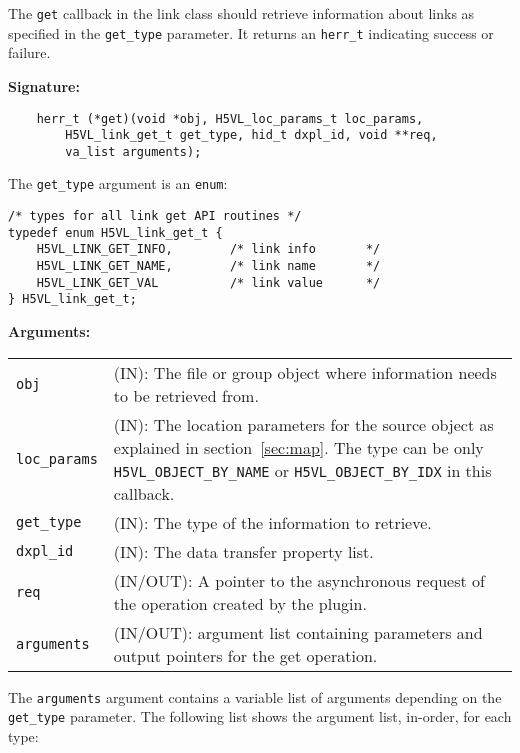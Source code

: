 The {\tt get} callback in the link class should retrieve information
about links as specified in the {\tt get\_type} parameter. It
returns an {\tt herr\_t} indicating success or failure.

\textbf{Signature:}
\begin{lstlisting}
    herr_t (*get)(void *obj, H5VL_loc_params_t loc_params, 
        H5VL_link_get_t get_type, hid_t dxpl_id, void **req, 
        va_list arguments);
\end{lstlisting}

The {\tt get\_type} argument is an {\tt enum}:
\begin{lstlisting}
/* types for all link get API routines */
typedef enum H5VL_link_get_t {
    H5VL_LINK_GET_INFO,        /* link info       */
    H5VL_LINK_GET_NAME,        /* link name       */
    H5VL_LINK_GET_VAL          /* link value      */
} H5VL_link_get_t;
\end{lstlisting}

\textbf{Arguments:}\\
\begin{tabular}{l p{10cm}}
  {\tt obj} & (IN): The file or group object where information needs to be
  retrieved from.\\
  {\tt loc\_params} & (IN): The location parameters for the source
  object as explained in section~\ref{sec:map}. The type can be only {\tt
    H5VL\_OBJECT\_BY\_NAME} or {\tt H5VL\_OBJECT\_BY\_IDX} in this
  callback.\\ 
  {\tt get\_type} & (IN): The type of the information to retrieve.\\
  {\tt dxpl\_id} & (IN): The data transfer property list.\\
  {\tt req} & (IN/OUT): A pointer to the asynchronous request of the
  operation created by the plugin.\\
  {\tt arguments} & (IN/OUT): argument list containing parameters and
  output pointers for the get operation. \\
\end{tabular}

The {\tt arguments} argument contains a variable list of arguments
depending on the {\tt get\_type} parameter. The following list shows
the argument list, in-order, for each type:

